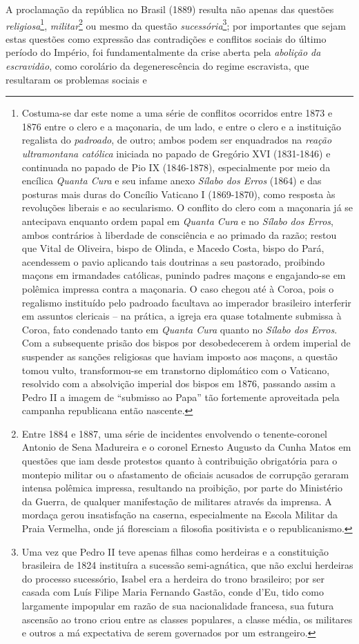 A proclamação da república no Brasil (1889) resulta não apenas das questões \textit{religiosa}\footnote{Costuma-se dar este nome a uma série de conflitos ocorridos entre 1873 e 1876 entre o clero e a maçonaria, de um lado, e entre o clero e a instituição regalista do \textit{padroado}, de outro; ambos podem ser enquadrados na \textit{reação ultramontana católica} iniciada no papado de Gregório XVI (1831-1846) e continuada no papado de Pio IX (1846-1878), especialmente por meio da encílica \textit{Quanta Cura} e seu infame anexo \textit{Sílabo dos Erros} (1864) e das posturas mais duras do Concílio Vaticano I (1869-1870), como resposta às revoluções liberais e ao secularismo. O conflito do clero com a maçonaria já se antecipava enquanto ordem papal em \textit{Quanta Cura} e no \textit{Sílabo dos Erros}, ambos contrários à liberdade de consciência e ao primado da razão; restou que Vital de Oliveira, bispo de Olinda, e Macedo Costa, bispo do Pará, acendessem o pavio aplicando tais doutrinas a seu pastorado, proibindo maçons em irmandades católicas, punindo padres maçons e engajando-se em polêmica impressa contra a maçonaria. O caso chegou até à Coroa, pois o regalismo instituído pelo padroado facultava ao imperador brasileiro interferir em assuntos clericais -- na prática, a igreja era quase totalmente submissa à Coroa, fato condenado tanto em \textit{Quanta Cura} quanto no \textit{Sílabo dos Erros}. Com a subsequente prisão dos bispos por desobedecerem à ordem imperial de suspender as sanções religiosas que haviam imposto aos maçons, a questão tomou vulto, transformou-se em transtorno diplomático com o Vaticano, resolvido com a absolvição imperial dos bispos em 1876, passando assim a Pedro II a imagem de ``submisso ao Papa'' tão fortemente aproveitada pela campanha republicana então nascente.}, \textit{militar}\footnote{Entre 1884 e 1887, uma série de incidentes envolvendo o tenente-coronel Antonio de Sena Madureira e o coronel Ernesto Augusto da Cunha Matos em questões que iam desde protestos quanto à contribuição obrigatória para o montepio militar ou o afastamento de oficiais acusados de corrupção geraram intensa polêmica impressa, resultando na proibição, por parte do Ministério da Guerra, de qualquer manifestação de militares através da imprensa. A mordaça gerou insatisfação na caserna, especialmente na Escola Militar da Praia Vermelha, onde já floresciam a filosofia positivista e o republicanismo.} ou mesmo da questão \textit{sucessória}\footnote{Uma vez que Pedro II teve apenas filhas como herdeiras e a constituição brasileira de 1824 instituíra a sucessão semi-agnática, que não exclui herdeiras do processo sucessório, Isabel era a herdeira do trono brasileiro; por ser casada com Luís Filipe Maria Fernando Gastão, conde d'Eu, tido como largamente impopular em razão de sua nacionalidade francesa, sua futura ascensão ao trono criou entre as classes populares, a classe média, os militares e outros a má expectativa de serem governados por um estrangeiro.}; por importantes que sejam estas questões como expressão das contradições e conflitos sociais do último período do Império, foi fundamentalmente da crise aberta pela \textit{abolição da escravidão}, como corolário da degenerescência do regime escravista, que resultaram os problemas sociais e 